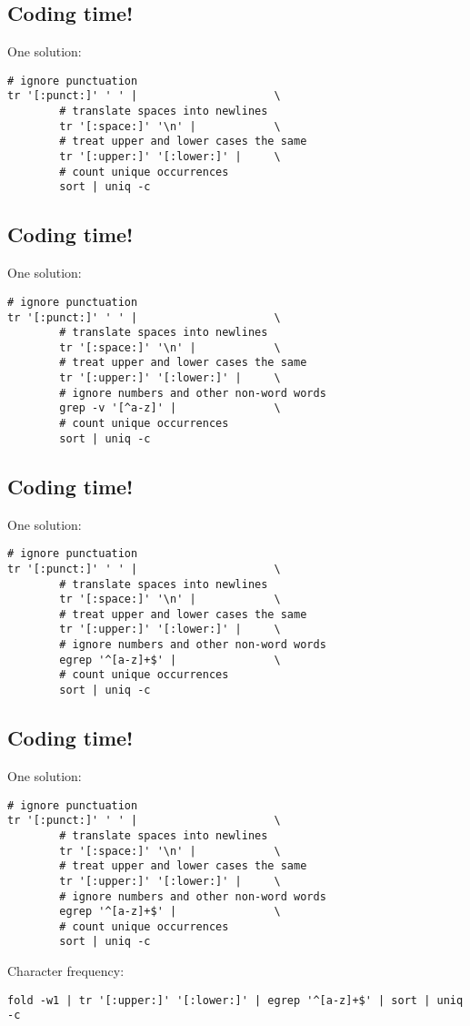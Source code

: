 \documentclass[xga]{xdvislides}
\begin{document}
\subsection{Coding time!}
One solution:
\begin{verbatim}
# ignore punctuation
tr '[:punct:]' ' ' |                     \
        # translate spaces into newlines
        tr '[:space:]' '\n' |            \
        # treat upper and lower cases the same
        tr '[:upper:]' '[:lower:]' |     \
        # count unique occurrences
        sort | uniq -c
\end{verbatim}

\subsection{Coding time!}
One solution:
\begin{verbatim}
# ignore punctuation
tr '[:punct:]' ' ' |                     \
        # translate spaces into newlines
        tr '[:space:]' '\n' |            \
        # treat upper and lower cases the same
        tr '[:upper:]' '[:lower:]' |     \
        # ignore numbers and other non-word words
        grep -v '[^a-z]' |               \
        # count unique occurrences
        sort | uniq -c
\end{verbatim}

\subsection{Coding time!}
One solution:
\begin{verbatim}
# ignore punctuation
tr '[:punct:]' ' ' |                     \
        # translate spaces into newlines
        tr '[:space:]' '\n' |            \
        # treat upper and lower cases the same
        tr '[:upper:]' '[:lower:]' |     \
        # ignore numbers and other non-word words
        egrep '^[a-z]+$' |               \
        # count unique occurrences
        sort | uniq -c
\end{verbatim}

\subsection{Coding time!}
One solution:
\begin{verbatim}
# ignore punctuation
tr '[:punct:]' ' ' |                     \
        # translate spaces into newlines
        tr '[:space:]' '\n' |            \
        # treat upper and lower cases the same
        tr '[:upper:]' '[:lower:]' |     \
        # ignore numbers and other non-word words
        egrep '^[a-z]+$' |               \
        # count unique occurrences
        sort | uniq -c
\end{verbatim}
\vspace{.5in}
Character frequency:
\begin{verbatim}
fold -w1 | tr '[:upper:]' '[:lower:]' | egrep '^[a-z]+$' | sort | uniq -c
\end{verbatim}
\end{document}
